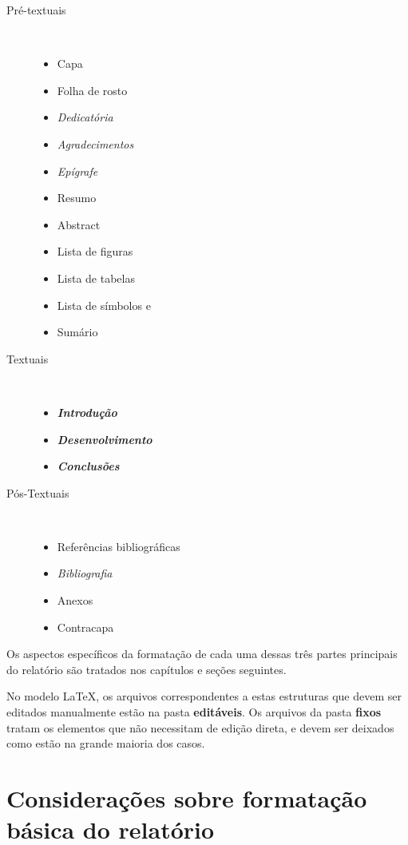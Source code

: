 \begin{description}
	\item [Pré-textuais] \

	\begin{itemize}
		\item Capa
		\item Folha de rosto
		\item \textit{Dedicatória}
		\item \textit{Agradecimentos}
		\item \textit{Epígrafe}
		\item Resumo
		\item Abstract
		\item Lista de figuras
		\item Lista de tabelas
		\item Lista de símbolos e
		\item Sumário
	\end{itemize}

	\item [Textuais] \

	\begin{itemize}
		\item \textbf{\textit{Introdução}}
		\item \textbf{\textit{Desenvolvimento}}
		\item \textbf{\textit{Conclusões}}
	\end{itemize}

	\item [Pós-Textuais] \
	
	\begin{itemize}
		\item Referências bibliográficas
		\item \textit{Bibliografia}
		\item Anexos
		\item Contracapa
	\end{itemize}
\end{description}

Os aspectos específicos da formatação de cada uma dessas três partes 
principais do relatório são tratados nos capítulos e seções seguintes.

No modelo \LaTeX, os arquivos correspondentes a estas estruturas que devem ser editados manualmente estão na pasta \textbf{editáveis}. Os arquivos da pasta \textbf{fixos} tratam os elementos que não necessitam de  edição direta, e devem ser deixados como estão na grande maioria dos casos.

\section{Considerações sobre formatação básica do relatório}

